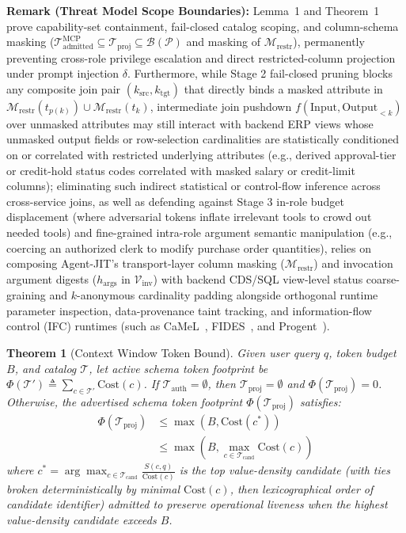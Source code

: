 \documentclass[conference,10pt]{IEEEtran}
\newtheorem{theorem}{Theorem}
\begin{document}
\noindent\textbf{Remark (Threat Model Scope Boundaries):} Lemma~1 and Theorem~1 prove capability-set containment, fail-closed catalog scoping, and column-schema masking ($\mathcal{T}_{\text{admitted}}^{\text{MCP}} \subseteq \mathcal{T}_{\text{proj}} \subseteq \mathcal{B}(\mathcal{P})$ and masking of $\mathcal{M}_{\text{restr}}$), permanently preventing cross-role privilege escalation and direct restricted-column projection under prompt injection $\delta$. Furthermore, while Stage 2 fail-closed pruning blocks any composite join pair $(k_{\text{src}}, k_{\text{tgt}})$ that directly binds a masked attribute in $\mathcal{M}_{\text{restr}}(t_{p(k)}) \cup \mathcal{M}_{\text{restr}}(t_k)$, intermediate join pushdown $f(\text{Input}, \text{Output}_{<k})$ over unmasked attributes may still interact with backend ERP views whose unmasked output fields or row-selection cardinalities are statistically conditioned on or correlated with restricted underlying attributes (e.g., derived approval-tier or credit-hold status codes correlated with masked salary or credit-limit columns); eliminating such indirect statistical or control-flow inference across cross-service joins, as well as defending against Stage 3 in-role budget displacement (where adversarial tokens inflate irrelevant tools to crowd out needed tools) and fine-grained intra-role argument semantic manipulation (e.g., coercing an authorized clerk to modify purchase order quantities), relies on composing Agent-JIT's transport-layer column masking ($\mathcal{M}_{\text{restr}}$) and invocation argument digests ($h_{\text{args}}$ in $\mathcal{V}_{\text{inv}}$) with backend CDS/SQL view-level status coarse-graining and $k$-anonymous cardinality padding alongside orthogonal runtime parameter inspection, data-provenance taint tracking, and information-flow control (IFC) runtimes (such as CaMeL~\cite{debenedetti2025camel}, FIDES~\cite{costa2025fides}, and Progent~\cite{shi2025progent}).

\begin{theorem}[Context Window Token Bound]
Given user query $q$, token budget $B$, and catalog $\mathcal{T}$, let active schema token footprint be $\Phi(\mathcal{T}') \triangleq \sum_{c \in \mathcal{T}'} \text{Cost}(c)$. If $\mathcal{T}_{\text{auth}} = \emptyset$, then $\mathcal{T}_{\text{proj}} = \emptyset$ and $\Phi(\mathcal{T}_{\text{proj}}) = 0$. Otherwise, the advertised schema token footprint $\Phi(\mathcal{T}_{\text{proj}})$ satisfies:
\begin{equation}
\begin{aligned}
\Phi(\mathcal{T}_{\text{proj}}) &\le \max\left(B, \text{Cost}(c^*)\right) \\
&\le \max\left(B, \max_{c \in \mathcal{T}_{\text{cand}}} \text{Cost}(c)\right)
\end{aligned}
\end{equation}
where $c^* = \arg\max_{c \in \mathcal{T}_{\text{cand}}} \frac{S(c, q)}{\text{Cost}(c)}$ is the top value-density candidate (with ties broken deterministically by minimal $\text{Cost}(c)$, then lexicographical order of candidate identifier) admitted to preserve operational liveness when the highest value-density candidate exceeds $B$.
\end{theorem}
\end{document}

